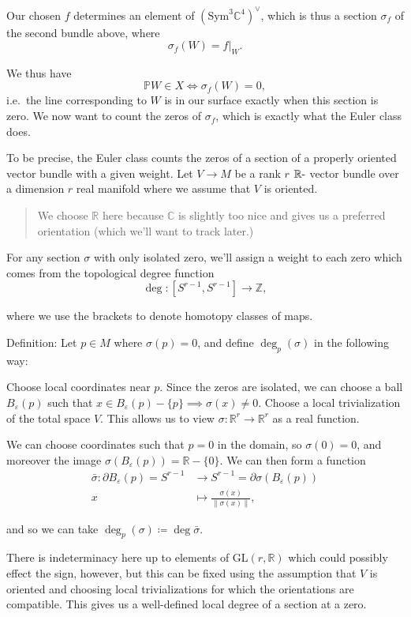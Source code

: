 \documentclass[11pt]{scrreprt}
\theoremstyle{definition}
\newcommand{\RR}[0]{{\mathbb{R}}}
\newcommand{\ZZ}[0]{{\mathbb{Z}}}
\newcommand{\CC}[0]{{\mathbb{C}}}
\newcommand{\PP}[0]{{\mathbb{P}}}
\newcommand{\GL}[0]{{\text{GL}}}
\newcommand{\dual}[0]{\vee}
\newcommand{\sym}[0]{\mathrm{Sym}}
\newcommand{\theset}[1]{\{{#1}\}}
\newcommand{\norm}[1]{{{\lVert}{#1}{\rVert}}}
\newcommand{\restrictionof}[2]{{\left.{#1}\right|_{#2}}}
\newcommand{\dash}[0]{{\hbox{-}}}
\newcommand{\del}[0]{{\partial}}
\newcommand{\definedas}[0]{\coloneqq}
\begin{document}
Our chosen \(f\) determines an element of \((\sym^3 \CC^4)^\dual\),
which is thus a section \(\sigma_f\) of the second bundle above, where
\[
\sigma_f(W) = \restrictionof{f}{W}.
\]

We thus have \[
\PP W \in X \iff \sigma_f(W) = 0,
\] i.e.~the line corresponding to \(W\) is in our surface exactly when
this section is zero. We now want to count the zeros of \(\sigma_f\),
which is exactly what the Euler class does.

To be precise, the Euler class counts the zeros of a section of a
properly oriented vector bundle with a given weight. Let \(V\to M\) be a
rank \(r\) \(\RR\dash\) vector bundle over a dimension \(r\) real
manifold where we assume that \(V\) is oriented.

\begin{quote}
We choose \(\RR\) here because \(\CC\) is slightly too nice and gives us
a preferred orientation (which we'll want to track later.)
\end{quote}

For any section \(\sigma\) with only isolated zero, we'll assign a
weight to each zero which comes from the topological degree function \[
\deg: [S^{r-1}, S^{r-1}] \to \ZZ,
\]

where we use the brackets to denote homotopy classes of maps.

Definition: Let \(p\in M\) where \(\sigma(p) = 0\), and define
\(\deg_p(\sigma)\) in the following way:

Choose local coordinates near \(p\). Since the zeros are isolated, we
can choose a ball \(B_\varepsilon(p)\) such that
\(x\in B_\varepsilon(p) - \theset{p} \implies \sigma(x) \neq 0\). Choose
a local trivialization of the total space \(V\). This allows us to view
\(\sigma: \RR^r \to \RR^r\) as a real function.

We can choose coordinates such that \(p = 0\) in the domain, so
\(\sigma(0) = 0\), and moreover the image
\(\sigma(B_\varepsilon(p)) = \RR - \theset{0}\). We can then form a
function
\begin{align*}
\bar\sigma: \del B_\varepsilon(p) = S^{r-1} &\to S^{r-1} = \del \sigma(B_\varepsilon(p)) \\
x &\mapsto \frac{\sigma(x)} {\norm{\sigma(x)}},
\end{align*}

and so we can take \(\deg_p(\sigma) \definedas \deg \bar \sigma\).

There is indeterminacy here up to elements of \(\GL(r, \RR)\) which
could possibly effect the sign, however, but this can be fixed using the
assumption that \(V\) is oriented and choosing local trivializations for
which the orientations are compatible. This gives us a well-defined
local degree of a section at a zero.
\end{document}
